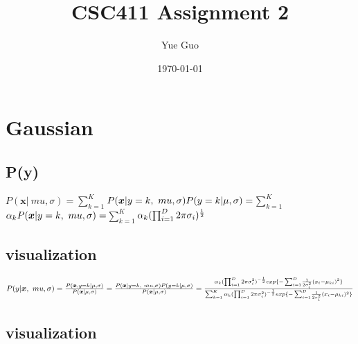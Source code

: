 \documentclass[letterpaper]{article}
\date{\today}
\title{CSC411 Assignment 2}
\author{Yue Guo}
\begin{document}
\maketitle


\section{Gaussian}

\subsection{P(y)}

$P( \bm{x} | \ mu ,  \sigma) = $$\sum_{k = 1}^{K}$$  P( \bm{x} | y = k, \ mu ,  \sigma) P(y = k | \mu, \sigma) \\
= $$  \sum_{k = 1}^{K}$$ \alpha_{k} P( \bm{x} | y = k, \ mu ,  \sigma) \\
= $$ \sum_{k = 1}^{K}$$ \alpha_{k} (\prod_{i=1}^{D} 2\pi \sigma_{i})^{\frac{1}{2}} \\$
\\
\subsection{visualization}

$P(y | \bm{x} , \ mu ,  \sigma) = \frac{P( \bm{x}, y = k | \mu ,  \sigma)}{P( \bm{x} |  \mu ,  \sigma)}
\\
= \frac{P( \bm{x} | y = k, \ mu ,  \sigma) P(y = k | \mu ,  \sigma)}{P( \bm{x} |  \mu ,  \sigma)}
\\
=\frac{ \alpha_{k} (\prod_{i=1}^{D} 2\pi \sigma_{i} ^{2})^{-\frac{1}{2}}  exp\{{- \sum_{i=1}^{D}} \frac{1}
{2 \sigma_{i} ^2} (x_{i} - \mu_{ki})^2 \}  }{\sum_{k=1}^{K} \alpha_{k} (\prod_{i=1}^{D} 2\pi \sigma_{i} ^{2})^{-\frac{1}{2}}  exp\{{- \sum_{i=1}^{D}} \frac{1}
{2 \sigma_{i} ^2} (x_{i} - \mu_{ki})^2 \}}$ \\
\subsection{visualization}
\end{document}
